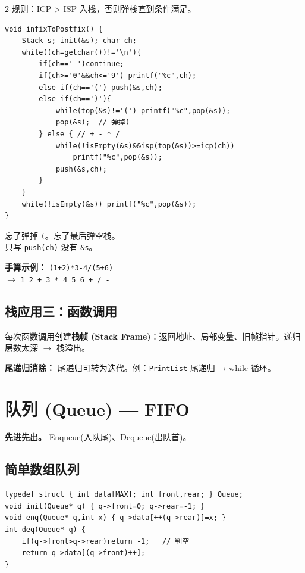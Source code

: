 \documentclass[10pt,a4paper]{article}
\begin{document}
\begin{multicols}{2}
规则：ICP > ISP 入栈，否则弹栈直到条件满足。

\begin{lstlisting}
void infixToPostfix() {
    Stack s; init(&s); char ch;
    while((ch=getchar())!='\n'){
        if(ch==' ')continue;
        if(ch>='0'&&ch<='9') printf("%c",ch);
        else if(ch=='(') push(&s,ch);
        else if(ch==')'){
            while(top(&s)!='(') printf("%c",pop(&s));
            pop(&s);  // 弹掉(
        } else { // + - * /
            while(!isEmpty(&s)&&isp(top(&s))>=icp(ch))
                printf("%c",pop(&s));
            push(&s,ch);
        }
    }
    while(!isEmpty(&s)) printf("%c",pop(&s));
}
\end{lstlisting}

\begin{bugbox}
忘了弹掉 \texttt{(}。忘了最后弹空栈。\\
只写 \texttt{push(ch)} 没有 \texttt{\&s}。
\end{bugbox}

\textbf{手算示例：} \texttt{(1+2)*3-4/(5+6)} \\
$\to$ \texttt{1 2 + 3 * 4 5 6 + / -}

\subsection*{栈应用三：函数调用}

每次函数调用创建\textbf{栈帧 (Stack Frame)}：返回地址、局部变量、旧帧指针。递归层数太深 $\to$ 栈溢出。

\textbf{尾递归消除：} 尾递归可转为迭代。例：\texttt{PrintList} 尾递归 → while 循环。

\section*{队列 (Queue) — FIFO}

\textbf{先进先出。} Enqueue(入队尾)、Dequeue(出队首)。

\subsection*{简单数组队列}

\begin{lstlisting}
typedef struct { int data[MAX]; int front,rear; } Queue;
void init(Queue* q) { q->front=0; q->rear=-1; }
void enq(Queue* q,int x) { q->data[++(q->rear)]=x; }
int deq(Queue* q) {
    if(q->front>q->rear)return -1;   // 判空
    return q->data[(q->front)++];
}
\end{lstlisting}


\end{multicols}
\end{document}
